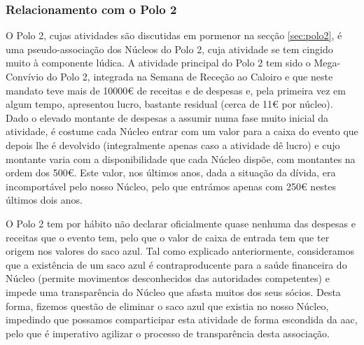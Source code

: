 
\subsubsection{Relacionamento com o Polo 2}

O Polo 2, cujas atividades são discutidas em pormenor na secção \ref{sec:polo2}, é uma pseudo-associação dos Núcleos do Polo 2, cuja atividade se tem cingido muito à componente lúdica. A atividade principal do Polo 2 tem sido o Mega-Convívio do Polo 2, integrada na Semana de Receção ao Caloiro e que neste mandato teve mais de 10000€ de receitas e de despesas e, pela primeira vez em algum tempo, apresentou lucro, bastante residual (cerca de 11€ por núcleo). Dado o elevado montante de despesas a assumir numa fase muito inicial da atividade, é costume cada Núcleo entrar com um valor para a caixa do evento que depois lhe é devolvido (integralmente apenas caso a atividade dê lucro) e cujo montante varia com a disponibilidade que cada Núcleo dispõe, com montantes na ordem dos 500€. Este valor, nos últimos anos, dada a situação da dívida, era incomportável pelo nosso Núcleo, pelo que entrámos apenas com 250€ nestes últimos dois anos.

O Polo 2 tem por hábito não declarar oficialmente quase nenhuma das despesas e receitas que o evento tem, pelo que o valor de caixa de entrada tem que ter origem nos valores do saco azul. Tal como explicado anteriormente, consideramos que a existência de um saco azul é contraproducente para a saúde financeira do Núcleo (permite movimentos desconhecidos das autoridades competentes) e impede uma transparência do Núcleo que afasta muitos dos seus sócios. Desta forma, fizemos questão de eliminar o saco azul que existia no nosso Núcleo, impedindo que possamos comparticipar esta atividade de forma escondida da \acrshort{aac}, pelo que é imperativo agilizar o processo de transparência desta associação.